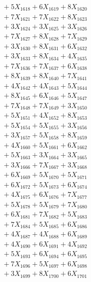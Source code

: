\documentclass[a4paper,10pt]{article}
\begin{document}
{\begin{align}
&\;  + 5 X_{1618} + 6 X_{1619} + 8 X_{1620} \\[0.3ex]
&\;  + 7 X_{1621} + 7 X_{1622} + 8 X_{1623} \\[0.3ex]
&\;  + 3 X_{1624} + 3 X_{1625} + 3 X_{1626} \\[0.3ex]
&\;  + 7 X_{1627} + 8 X_{1628} + 7 X_{1629} \\[0.5ex]\allowbreak
&\;  + 3 X_{1630} + 8 X_{1631} + 6 X_{1632} \\[0.3ex]
&\;  + 3 X_{1633} + 8 X_{1634} + 4 X_{1635} \\[0.3ex]
&\;  + 7 X_{1636} + 7 X_{1637} + 6 X_{1638} \\[0.3ex]
&\;  + 8 X_{1639} + 8 X_{1640} + 7 X_{1641} \\[0.3ex]
&\;  + 4 X_{1642} + 4 X_{1643} + 5 X_{1644} \\[0.3ex]
&\;  + 8 X_{1645} + 6 X_{1646} + 5 X_{1647} \\[0.3ex]
&\;  + 7 X_{1648} + 7 X_{1649} + 3 X_{1650} \\[0.3ex]
&\;  + 5 X_{1651} + 4 X_{1652} + 8 X_{1653} \\[0.3ex]
&\;  + 5 X_{1654} + 5 X_{1655} + 3 X_{1656} \\[0.3ex]
&\;  + 3 X_{1657} + 5 X_{1658} + 8 X_{1659} \\[0.5ex]\allowbreak
&\;  + 4 X_{1660} + 5 X_{1661} + 6 X_{1662} \\[0.3ex]
&\;  + 5 X_{1663} + 3 X_{1664} + 3 X_{1665} \\[0.3ex]
&\;  + 3 X_{1666} + 7 X_{1667} + 3 X_{1668} \\[0.3ex]
&\;  + 6 X_{1669} + 5 X_{1670} + 5 X_{1671} \\[0.3ex]
&\;  + 6 X_{1672} + 5 X_{1673} + 6 X_{1674} \\[0.3ex]
&\;  + 4 X_{1675} + 6 X_{1676} + 7 X_{1677} \\[0.3ex]
&\;  + 5 X_{1678} + 5 X_{1679} + 7 X_{1680} \\[0.3ex]
&\;  + 6 X_{1681} + 7 X_{1682} + 5 X_{1683} \\[0.3ex]
&\;  + 7 X_{1684} + 5 X_{1685} + 6 X_{1686} \\[0.3ex]
&\;  + 4 X_{1687} + 4 X_{1688} + 6 X_{1689} \\[0.5ex]\allowbreak
&\;  + 4 X_{1690} + 6 X_{1691} + 4 X_{1692} \\[0.3ex]
&\;  + 5 X_{1693} + 6 X_{1694} + 6 X_{1695} \\[0.3ex]
&\;  + 7 X_{1696} + 5 X_{1697} + 6 X_{1698} \\[0.3ex]
&\;  + 3 X_{1699} + 8 X_{1700} + 6 X_{1701} \\[0.3ex]

\end{align}}
\end{document}
